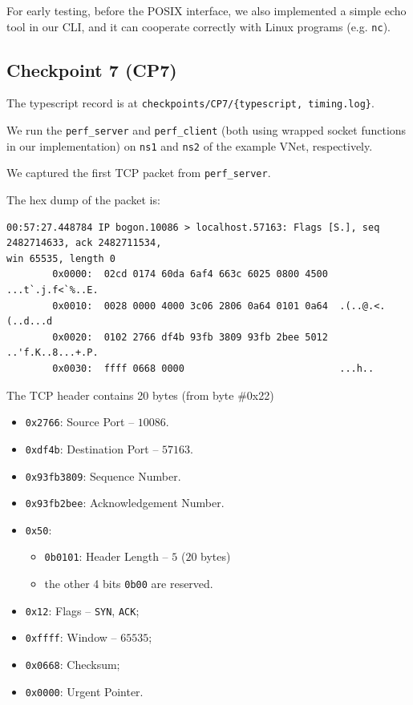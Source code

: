 \documentclass[a4paper]{article}
\begin{document}
  For early testing, before the POSIX interface, we also implemented a simple echo tool in our CLI, and it can cooperate correctly with Linux programs (e.g. \texttt{nc}).

  \subsection{Checkpoint 7 (CP7)}

  The typescript record is at \texttt{checkpoints/CP7/\{typescript, timing.log\}}.

  We run the \texttt{perf\_server} and \texttt{perf\_client} (both using wrapped socket functions in our implementation) on \texttt{ns1} and \texttt{ns2} of the example VNet, respectively.

  We captured the first TCP packet from \texttt{perf\_server}.

  The hex dump of the packet is:
  \begin{verbatim}
00:57:27.448784 IP bogon.10086 > localhost.57163: Flags [S.], seq 2482714633, ack 2482711534,
win 65535, length 0
        0x0000:  02cd 0174 60da 6af4 663c 6025 0800 4500  ...t`.j.f<`%..E.
        0x0010:  0028 0000 4000 3c06 2806 0a64 0101 0a64  .(..@.<.(..d...d
        0x0020:  0102 2766 df4b 93fb 3809 93fb 2bee 5012  ..'f.K..8...+.P.
        0x0030:  ffff 0668 0000                           ...h..
  \end{verbatim}

  The TCP header contains 20 bytes (from byte \#0x22)
  \begin{itemize}
    \item \texttt{0x2766}: Source Port -- $10086$.
    \item \texttt{0xdf4b}: Destination Port -- $57163$.
    \item \texttt{0x93fb3809}: Sequence Number.
    \item \texttt{0x93fb2bee}: Acknowledgement Number.
    \item \texttt{0x50}: \begin{itemize}
      \item \texttt{0b0101}: Header Length -- $5$ ($20$ bytes)
      \item the other 4 bits \texttt{0b00} are reserved.
    \end{itemize}
    \item \texttt{0x12}: Flags -- \texttt{SYN}, \texttt{ACK};
    \item \texttt{0xffff}: Window -- $65535$;
    \item \texttt{0x0668}: Checksum;
    \item \texttt{0x0000}: Urgent Pointer.
  \end{itemize}
\end{document}
